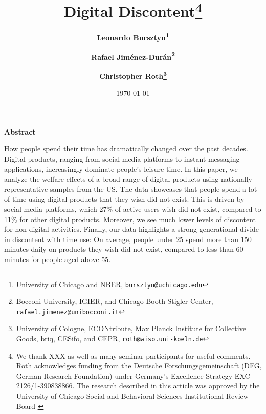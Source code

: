 \documentclass[11pt]{article}
\begin{document}



\author{\textbf{Leonardo Bursztyn\thanks{University of Chicago and NBER, \texttt{bursztyn@uchicago.edu}}}
\and \textbf{Rafael Jim\'{e}nez-Dur\'{a}n\thanks{Bocconi University, IGIER, and Chicago Booth Stigler Center, \texttt{rafael.jimenez@unibocconi.it}}}
\and \textbf{Christopher Roth\thanks{University of Cologne, ECONtribute, Max Planck Institute for Collective Goods, briq, CESifo, and CEPR, \texttt{roth@wiso.uni-koeln.de}}}}


% 

\title{\textbf{Digital Discontent}\thanks{
\footnotesize{We thank XXX as well as many seminar participants for useful comments. Roth acknowledges funding from the  Deutsche  Forschungsgemeinschaft  (DFG, German Research Foundation) under Germany’s Excellence Strategy EXC 2126/1-390838866. The research described in this article was approved by the University of Chicago Social and Behavioral Sciences Institutional Review Board }}}
\date{\today}


\maketitle


\thispagestyle {empty}\bigskip \vspace{-0.4in}

\begin{center}
\textbf{Abstract}
\end{center}

 
 
\begin{spacing}{1}
\noindent How people spend their time has dramatically changed over the past decades. Digital products, ranging from social media platforms to instant messaging applications, increasingly dominate people's leisure time. In this paper, we analyze the welfare effects of a broad range of digital products using nationally representative samples from the US. The data showcases that people spend a lot of time using digital products that they wish did not exist. This is driven by social media platforms, which 27\% of active users wish did not exist, compared to 11\% for other digital products. Moreover, we see much lower levels of discontent for non-digital activities. Finally, our data highlights a strong generational divide in discontent with time use: On average, people under 25 spend more than 150 minutes daily on products they wish did not exist, compared to less than 60 minutes for people aged above 55.


 
\end{spacing}
 
\end{document}
